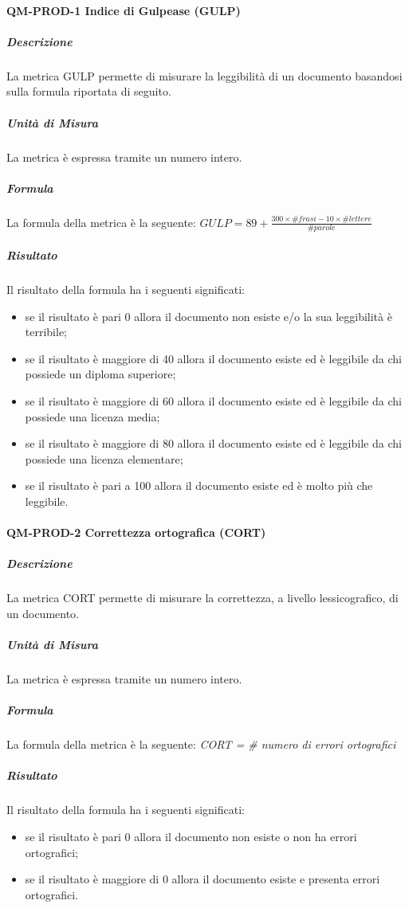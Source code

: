 				\paragraph{QM-PROD-1 Indice di Gulpease (GULP)}
					\subparagraph{Descrizione}
						La metrica GULP permette di misurare la leggibilità di un documento basandosi sulla formula riportata di seguito.
					\subparagraph{Unità di Misura}
						La metrica è espressa tramite un numero intero.
					\subparagraph{Formula}
						La formula della metrica è la seguente:
						\(
							GULP = 89+\frac{300\times\# frasi-10\times\#lettere}{\#parole}
						\)
					\subparagraph{Risultato}
						Il risultato della formula ha i seguenti significati:
						\begin{itemize}
							\item se il risultato è pari 0 allora il documento non esiste e/o la sua leggibilità è terribile;
							\item se il risultato è maggiore di 40 allora il documento esiste ed è leggibile da chi possiede un diploma superiore;
							\item se il risultato è maggiore di 60 allora il documento esiste ed è leggibile da chi possiede una licenza media;
							\item se il risultato è maggiore di 80 allora il documento esiste ed è leggibile da chi possiede una licenza elementare;
							\item se il risultato è pari a 100 allora il documento esiste ed è molto più che leggibile.
						\end{itemize}
				\paragraph{QM-PROD-2 Correttezza ortografica (CORT)}
					\subparagraph{Descrizione}
					La metrica CORT permette di misurare la correttezza, a livello lessicografico, di un documento.
					\subparagraph{Unità di Misura}
						La metrica è espressa tramite un numero intero.
					\subparagraph{Formula}
						La formula della metrica è la seguente:
						\textit{CORT = \# numero di errori ortografici}
					\subparagraph{Risultato}
						Il risultato della formula ha i seguenti significati:
						\begin{itemize}
							\item se il risultato è pari 0 allora il documento non esiste o non ha errori ortografici;
							\item se il risultato è maggiore di 0 allora il documento esiste e presenta errori ortografici.
						\end{itemize}
